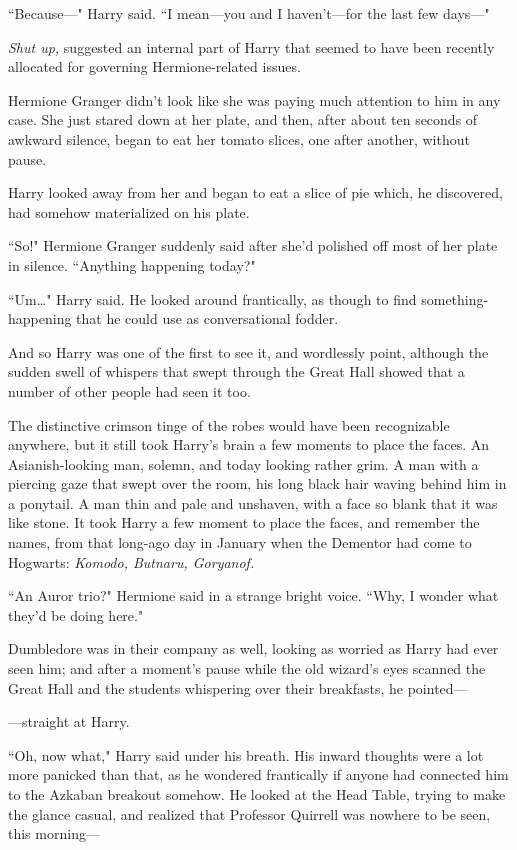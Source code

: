 ``Because—" Harry said. ``I mean—you and I haven't—for the last few days—"

\emph{Shut up,} suggested an internal part of Harry that seemed to have been recently allocated for governing Hermione-related issues.

Hermione Granger didn't look like she was paying much attention to him in any case. She just stared down at her plate, and then, after about ten seconds of awkward silence, began to eat her tomato slices, one after another, without pause.

Harry looked away from her and began to eat a slice of pie which, he discovered, had somehow materialized on his plate.

``So!" Hermione Granger suddenly said after she'd polished off most of her plate in silence. ``Anything happening today?"

``Um{\ldots}" Harry said. He looked around frantically, as though to find something-happening that he could use as conversational fodder.

And so Harry was one of the first to see it, and wordlessly point, although the sudden swell of whispers that swept through the Great Hall showed that a number of other people had seen it too.

The distinctive crimson tinge of the robes would have been recognizable anywhere, but it still took Harry's brain a few moments to place the faces. An Asianish-looking man, solemn, and today looking rather grim. A man with a piercing gaze that swept over the room, his long black hair waving behind him in a ponytail. A man thin and pale and unshaven, with a face so blank that it was like stone. It took Harry a few moment to place the faces, and remember the names, from that long-ago day in January when the Dementor had come to Hogwarts: \emph{Komodo, Butnaru, Goryanof.}

``An Auror trio?" Hermione said in a strange bright voice. ``Why, I wonder what they'd be doing here."

Dumbledore was in their company as well, looking as worried as Harry had ever seen him; and after a moment's pause while the old wizard's eyes scanned the Great Hall and the students whispering over their breakfasts, he pointed—

—straight at Harry.

``Oh, now what," Harry said under his breath. His inward thoughts were a lot more panicked than that, as he wondered frantically if anyone had connected him to the Azkaban breakout somehow. He looked at the Head Table, trying to make the glance casual, and realized that Professor Quirrell was nowhere to be seen, this morning—

